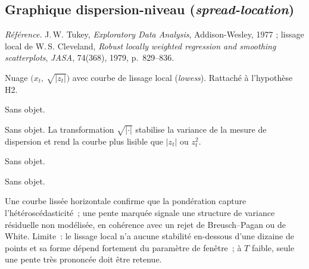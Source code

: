 \documentclass[a4paper,11pt]{article}
\newcommand{\refl}[1]{{\small\textcolor{maincolor!70!black}{\textit{Référence.} #1}}\par\smallskip}
\newcounter{ficheid}
\newenvironment{fiche}[1]{%
  \stepcounter{ficheid}%
  \phantomsection
  \subsection{#1}%
  \label{fiche:\theficheid}%
}{%
  \end{description}\vspace{0.5em}%
}
\newcommand{\Cadre}{%
  \begin{description}[leftmargin=0pt, style=unboxed, itemsep=3pt, topsep=3pt, parsep=2pt]%
  \item[\textcolor{financeblue}{\textbf{1. Cadre, notations et hypothèses de validité (non testées).}}]}
\newcommand{\Hzero}{\item[\textcolor{financeblue}{\textbf{2. Hypothèse nulle.}}]}
\newcommand{\Stat}{\item[\textcolor{financeblue}{\textbf{3. Statistique de test.}}]}
\newcommand{\Loi}{\item[\textcolor{financeblue}{\textbf{4. Loi sous $H_0$.}}]}
\newcommand{\Pval}{\item[\textcolor{financeblue}{\textbf{5. p-value.}}]}
\newcommand{\Usage}{\item[\textcolor{financeblue}{\textbf{6. Usage et limites.}}]}
\begin{document}
\begin{fiche}{Graphique dispersion-niveau (\emph{spread-location})}
\refl{J.\,W. Tukey, \emph{Exploratory Data Analysis}, Addison-Wesley, 1977 ; lissage local de
W.\,S. Cleveland, \emph{Robust locally weighted regression and smoothing scatterplots},
\emph{JASA}, 74(368), 1979, p.~829--836.}
\Cadre
Nuage $\big(x_t,\ \sqrt{|z_t|}\big)$ avec courbe de lissage local (\emph{lowess}). Rattaché à
l'hypothèse H2.
\Hzero
Sans objet.
\Stat
Sans objet. La transformation $\sqrt{|\cdot|}$ stabilise la variance de la mesure de dispersion et
rend la courbe plus lisible que $|z_t|$ ou $z_t^2$.
\Loi
Sans objet.
\Pval
Sans objet.
\Usage
Une courbe lissée horizontale confirme que la pondération capture l'hétéroscédasticité~; une pente
marquée signale une structure de variance résiduelle non modélisée, en cohérence avec un rejet de
Breusch--Pagan ou de White. Limite~: le lissage local n'a aucune stabilité en-dessous d'une
dizaine de points et sa forme dépend fortement du paramètre de fenêtre~; à $T$ faible, seule une
pente très prononcée doit être retenue.
\end{fiche}
\end{document}
